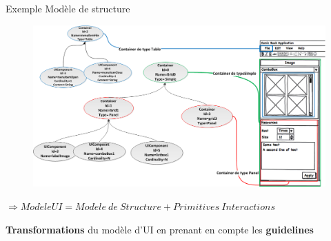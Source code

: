 \documentclass[11pt]{beamer}
\begin{document}
\begin{frame}[t]{Exemple Modèle de structure } %
\begin{figure}[t]
\includegraphics[scale=.35]{../chap4/typecontainers}
\end{figure}
{\scriptsize $ \Rightarrow Mod\grave ele UI = Mod\grave ele\ de\ Structure + Primitives\ Interactions $}
\pause
\begin{block}{{\scriptsize \textbf{Transformations} du modèle d'UI en prenant en compte les \textbf{guidelines} }}
\end{block}

\end{frame}
\end{document}
